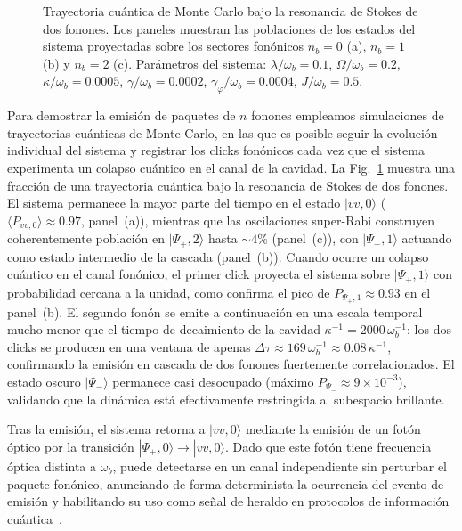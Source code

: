 \begin{figure}[H]
	\centering
	
	\caption{Trayectoria cuántica de Monte Carlo bajo la resonancia de Stokes de dos fonones. Los paneles muestran las poblaciones de los estados del sistema proyectadas sobre los sectores fonónicos $n_b = 0$ (a), $n_b = 1$ (b) y $n_b = 2$ (c). Parámetros del sistema: $\lambda/\omega_b = 0.1$, $\Omega/\omega_b = 0.2$, $\kappa/\omega_b = 0.0005$, $\gamma/\omega_b = 0.0002$, $\gamma_\varphi/\omega_b = 0.0004$, $J/\omega_b = 0.5$.}
	\label{fig:trayectoria}
\end{figure}

Para demostrar la emisión de paquetes de $n$ fonones empleamos simulaciones de trayectorias cuánticas de Monte Carlo, en las que es posible seguir la evolución individual del sistema y registrar los clicks fonónicos cada vez que el sistema experimenta un colapso cuántico en el canal de la cavidad. La Fig.~\ref{fig:trayectoria} muestra una fracción de una trayectoria cuántica bajo la resonancia de Stokes de dos fonones. El sistema permanece la mayor parte del tiempo en el estado $|vv,0\rangle$ ($\langle P_{vv,0}\rangle \approx 0.97$, panel~(a)), mientras que las oscilaciones super-Rabi construyen coherentemente población en $|\Psi_+,2\rangle$ hasta $\sim 4\%$ (panel~(c)), con $|\Psi_+,1\rangle$ actuando como estado intermedio de la cascada (panel~(b)). Cuando ocurre un colapso cuántico en el canal fonónico, el primer click proyecta el sistema sobre $|\Psi_+,1\rangle$ con probabilidad cercana a la unidad, como confirma el pico de $P_{\Psi_+,1} \approx 0.93$ en el panel~(b). El segundo fonón se emite a continuación en una escala temporal mucho menor que el tiempo de decaimiento de la cavidad $\kappa^{-1} = 2000\,\omega_b^{-1}$: los dos clicks se producen en una ventana de apenas $\Delta\tau \approx 169\,\omega_b^{-1} \approx 0.08\,\kappa^{-1}$, confirmando la emisión en cascada de dos fonones fuertemente correlacionados. El estado oscuro $|\Psi_-\rangle$ permanece casi desocupado (máximo $P_{\Psi_-} \approx 9\times10^{-3}$), validando que la dinámica está efectivamente restringida al subespacio brillante.

Tras la emisión, el sistema retorna a $|vv,0\rangle$ mediante la emisión de un fotón óptico por la transición $|\Psi_+,0\rangle \to |vv,0\rangle$. Dado que este fotón tiene frecuencia óptica distinta a $\omega_b$, puede detectarse en un canal independiente sin perturbar el paquete fonónico, anunciando de forma determinista la ocurrencia del evento de emisión y habilitando su uso como señal de heraldo en protocolos de información cuántica~\cite{bin2020}.

